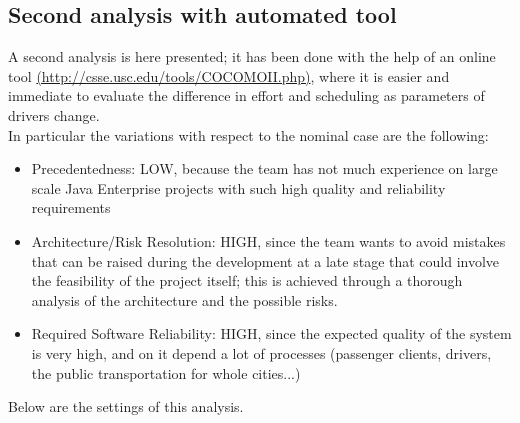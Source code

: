 \documentclass[a4paper,11pt]{report} %
\begin{document}
		\subsection{Second analysis with automated tool}
			A second analysis is here presented; it has been done with the help of an online tool \linebreak \href{http://csse.usc.edu/tools/COCOMOII.php}{(http://csse.usc.edu/tools/COCOMOII.php)}, where it is easier and immediate to evaluate the difference in effort and scheduling as parameters of drivers change.\bigskip\\
			In particular the variations with respect to the nominal case are the following:
			\begin{itemize}
				\item Precedentedness: LOW, because the team has not much experience on large scale Java Enterprise projects with such high quality and reliability requirements
				\item Architecture/Risk Resolution: HIGH, since the team wants to avoid mistakes that can be raised during the development at a late stage that could involve the feasibility of the project itself; this is achieved through a thorough analysis of the architecture and the possible risks.
				\item Required Software Reliability: HIGH, since the expected quality of the system is very high, and on it depend a lot of processes (passenger clients, drivers, the public transportation for whole cities...)
			\end{itemize}\bigskip
			Below are the settings of this analysis.\bigskip\\
			\begin{minipage}{\linewidth}
			\end{minipage}
\end{document}
